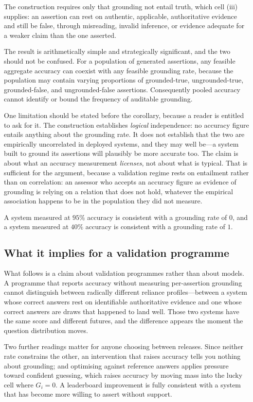 The construction requires only that grounding not entail truth, which cell (iii)
supplies: an assertion can rest on authentic, applicable, authoritative evidence
and still be false, through misreading, invalid inference, or evidence adequate for
a weaker claim than the one asserted.

The result is arithmetically simple and strategically significant, and the two
should not be confused. For a population of generated assertions, any feasible
aggregate accuracy can coexist with any feasible grounding rate, because the
population may contain varying proportions of grounded-true, ungrounded-true,
grounded-false, and ungrounded-false assertions. Consequently pooled accuracy
cannot identify or bound the frequency of auditable grounding.

One limitation should be stated before the corollary, because a reader is entitled to
ask for it. The construction establishes \emph{logical} independence: no accuracy
figure entails anything about the grounding rate. It does not establish that the two
are empirically uncorrelated in deployed systems, and they may well be---a system
built to ground its assertions will plausibly be more accurate too. The claim is about
what an accuracy measurement \emph{licenses}, not about what is typical. That is
sufficient for the argument, because a validation regime rests on entailment rather
than on correlation: an assessor who accepts an accuracy figure as evidence of
grounding is relying on a relation that does not hold, whatever the empirical
association happens to be in the population they did not measure.

\begin{corollary}
\label{cor:no-bound}
A system measured at $95\%$ accuracy is consistent with a grounding rate of $0$,
and a system measured at $40\%$ accuracy is consistent with a grounding rate of
$1$.
\end{corollary}

\subsection{What it implies for a validation programme}

What follows is a claim about validation programmes rather than about models. A
programme that reports accuracy without measuring per-assertion grounding cannot
distinguish between radically different reliance profiles---between a system whose
correct answers rest on identifiable authoritative evidence and one whose correct
answers are draws that happened to land well. Those two systems have the same
score and different futures, and the difference appears the moment the question
distribution moves.

Two further readings matter for anyone choosing between releases. Since neither rate constrains the other, an intervention that raises accuracy tells you nothing
about grounding; and optimising against reference answers applies pressure toward
confident guessing, which raises accuracy by moving mass into the lucky cell where
$G_i = 0$. A leaderboard improvement is fully consistent with a system that has
become more willing to assert without support.
